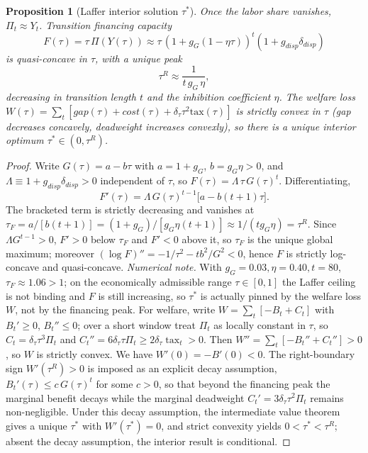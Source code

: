 \documentclass[review,12pt]{elsarticle}
\theoremstyle{plain}
\newtheorem{proposition}[theorem]{Proposition}
\theoremstyle{definition}
\theoremstyle{remark}
\begin{document}
\begin{proposition}[Laffer interior solution $\tau^*$]
\label{prop3b}
Once the labor share vanishes, $\Pi_t\approx Y_t$. Transition financing capacity
\[
F(\tau)=\tau\,\Pi(Y(\tau))\approx\tau\,(1+g_G(1-\eta\tau))^{t}(1+g_{disp}\delta_{disp})
\]
is \emph{quasi-concave} in $\tau$, with a unique peak
\[
\tau^{R}\approx\frac{1}{t\,g_G\,\eta},
\]
decreasing in transition length $t$ and the inhibition coefficient $\eta$. The welfare loss $W(\tau)=\sum_t[gap(\tau)+cost(\tau)+\delta_\tau\tau^2\text{tax}(\tau)]$ is strictly convex in $\tau$ (gap decreases concavely, deadweight increases convexly), so there is a unique interior optimum $\tau^*\in(0,\tau^{R})$.
\end{proposition}
\begin{proof}
Write $G(\tau)=a-b\tau$ with $a=1+g_G$, $b=g_G\eta>0$, and $\Lambda\equiv1+g_{disp}\delta_{disp}>0$ independent of $\tau$, so $F(\tau)=\Lambda\,\tau\,G(\tau)^t$. Differentiating,
\[
F'(\tau)=\Lambda\,G(\tau)^{t-1}\big[a-b(t+1)\tau\big].
\]
The bracketed term is strictly decreasing and vanishes at $\tau_F=a/[b(t+1)]=(1+g_G)/[g_G\eta(t+1)]\approx1/(t g_G\eta)=\tau^R$. Since $\Lambda G^{t-1}>0$, $F'>0$ below $\tau_F$ and $F'<0$ above it, so $\tau_F$ is the unique global maximum; moreover $(\log F)''=-1/\tau^2-tb^2/G^2<0$, hence $F$ is strictly log-concave and quasi-concave.
\smallskip\noindent\emph{Numerical note.} With $g_G=0.03,\eta=0.40,t=80$, $\tau_F\approx1.06>1$; on the economically admissible range $\tau\in[0,1]$ the Laffer ceiling is not binding and $F$ is still increasing, so $\tau^*$ is actually pinned by the welfare loss $W$, not by the financing peak.
\smallskip\noindent For welfare, write $W=\sum_t[-B_t+C_t]$ with $B_t'\ge0$, $B_t''\le0$; over a short window treat $\Pi_t$ as locally constant in $\tau$, so $C_t=\delta_\tau\tau^3\Pi_t$ and $C_t''=6\delta_\tau\tau\Pi_t\ge2\delta_\tau\operatorname{tax}_t>0$. Then $W''=\sum_t[-B_t''+C_t'']>0$, so $W$ is strictly convex. We have $W'(0)=-B'(0)<0$. The right-boundary sign $W'(\tau^R)>0$ is imposed as an explicit decay assumption, $B_t'(\tau)\le c\,G(\tau)^t$ for some $c>0$, so that beyond the financing peak the marginal benefit decays while the marginal deadweight $C_t'=3\delta_\tau\tau^2\Pi_t$ remains non-negligible. Under this decay assumption, the intermediate value theorem gives a unique $\tau^*$ with $W'(\tau^*)=0$, and strict convexity yields $0<\tau^*<\tau^R$; absent the decay assumption, the interior result is conditional.
\end{proof}
\end{document}
